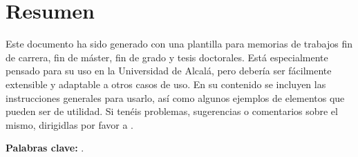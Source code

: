 %
%
%
% 
%
%
%
%

\chapter*{Resumen}
\label{cha:resumen}


Este documento ha sido generado con una plantilla para memorias de
trabajos fin de carrera, fin de máster, fin de grado y tesis
doctorales. Está especialmente pensado para su uso en la Universidad de
Alcalá, pero debería ser fácilmente extensible y adaptable a otros casos
de uso. En su contenido se incluyen las instrucciones generales para
usarlo, así como algunos ejemplos de elementos que pueden ser de
utilidad. Si tenéis problemas, sugerencias o comentarios sobre el mismo,
dirigidlas por favor a \contactauthor.

\textbf{Palabras clave:} \mybookpalabrasclave.



